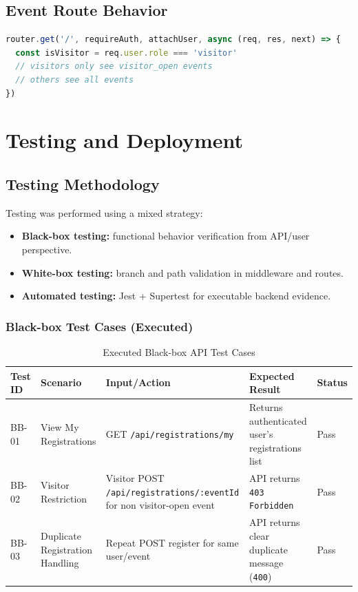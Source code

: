 \documentclass[12pt, a4paper]{article}
\begin{document}
\subsection{Event Route Behavior}
\begin{lstlisting}[language=JavaScript, caption=server/src/routes/events.js (conceptual excerpt)]
router.get('/', requireAuth, attachUser, async (req, res, next) => {
  const isVisitor = req.user.role === 'visitor'
  // visitors only see visitor_open events
  // others see all events
})
\end{lstlisting}

\newpage
\section{Testing and Deployment}

\subsection{Testing Methodology}
Testing was performed using a mixed strategy:
\begin{itemize}
    \item \textbf{Black-box testing:} functional behavior verification from API/user perspective.
    \item \textbf{White-box testing:} branch and path validation in middleware and routes.
    \item \textbf{Automated testing:} Jest + Supertest for executable backend evidence.
\end{itemize}

\subsubsection{Black-box Test Cases (Executed)}
\begin{table}[H]
\centering
\begin{small}
\begin{tabular}{|p{1.4cm}|p{3.5cm}|p{4.1cm}|p{4.0cm}|p{1.2cm}|}
\hline
\textbf{Test ID} & \textbf{Scenario} & \textbf{Input/Action} & \textbf{Expected Result} & \textbf{Status} \\ \hline
BB-01 & View My Registrations & GET \texttt{/api/registrations/my} & Returns authenticated user's registrations list & Pass \\ \hline
BB-02 & Visitor Restriction & Visitor POST \texttt{/api/registrations/:eventId} for non visitor-open event & API returns \texttt{403 Forbidden} & Pass \\ \hline
BB-03 & Duplicate Registration Handling & Repeat POST register for same user/event & API returns clear duplicate message (\texttt{400}) & Pass \\ \hline
\end{tabular}
\end{small}
\caption{Executed Black-box API Test Cases}
\end{table}
\end{document}
